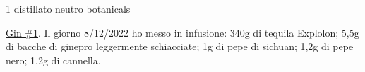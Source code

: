 \serves{-}%
\cooktime[]{-}%
\begin{ingreds}
	1 distillato neutro
	botanicals



\end{ingreds}

\begin{method}
\underline{Gin \#1}. Il giorno 8/12/2022 ho messo in infusione: 340g di tequila Explolon; 5,5g di bacche di ginepro leggermente schiacciate; 1g di pepe di sichuan; 1,2g di pepe nero; 1,2g di cannella.


\end{method}




